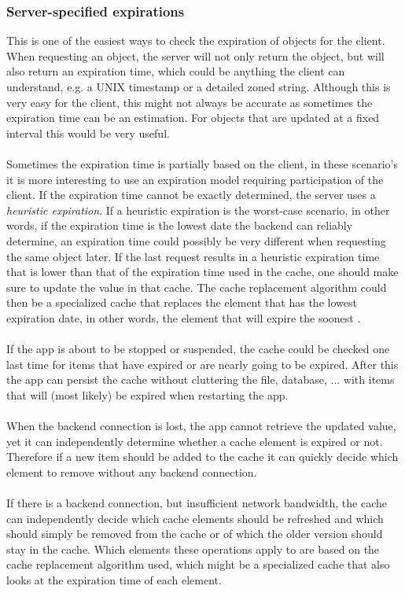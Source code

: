 \documentclass[pdftex,a4paper,12pt,twoside]{report}
\begin{document}
\subsubsection{Server-specified expirations}
\label{sec:server_spec_expirations}
This is one of the easiest ways to check the expiration of objects for the client. When requesting an object, the server will not only return the object, but will also return an expiration time, which could be anything the client can understand, e.g. a UNIX timestamp or a detailed zoned string. Although this is very easy for the client, this might not always be accurate as sometimes the expiration time can be an estimation. For objects that are updated at a fixed interval this would be very useful.
\\\\
Sometimes the expiration time is partially based on the client, in these scenario's it is more interesting to use an expiration model requiring participation of the client. If the expiration time cannot be exactly determined, the server uses a \emph{heuristic expiration}. If a heuristic expiration is the worst-case scenario, in other words, if the expiration time is the lowest date the backend can reliably determine, an expiration time could possibly be very different when requesting the same object later. If the last request results in a heuristic expiration time that is lower than that of the expiration time used in the cache, one should make sure to update the value in that cache. The cache replacement algorithm could then be a specialized cache that replaces the element that has the lowest expiration date, in other words, the element that will expire the soonest \citep{http_caching}.
\\\\
If the app is about to be stopped or suspended, the cache could be checked one last time for items that have expired or are nearly going to be expired. After this the app can persist the cache without cluttering the file, database, ... with items that will (most likely) be expired when restarting the app.
\\\\
When the backend connection is lost, the app cannot retrieve the updated value, yet it can independently determine whether a cache element is expired or not. Therefore if a new item should be added to the cache it can quickly decide which element to remove without any backend connection.
\\\\
If there is a backend connection, but insufficient network bandwidth, the cache can independently decide which cache elements should be refreshed and which should simply be removed from the cache or of which the older version should stay in the cache. Which elements these operations apply to are based on the cache replacement algorithm used, which might be a specialized cache that also looks at the expiration time of each element.
\end{document}
